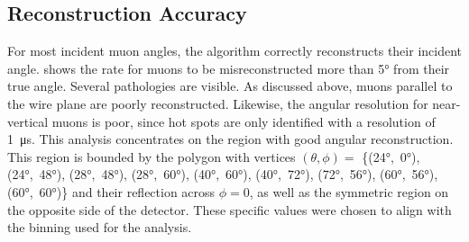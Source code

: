 \documentclass[herrin-thesis.tex]{subfiles}
\begin{document}
\subsection{Reconstruction Accuracy}
For most incident muon angles, the algorithm correctly reconstructs their incident angle.  shows the rate for muons to be misreconstructed more than \ang{5} from their true angle. Several pathologies are visible. As discussed above, muons parallel to the wire plane are poorly reconstructed. Likewise, the angular resolution for near-vertical muons is poor, since hot spots are only identified with a resolution of \SI{1}{\micro\s}. This analysis concentrates on the region with good angular reconstruction. This region is bounded by the polygon with vertices \((\theta,\phi) =\) \{(\ang{24},~\ang{0}), (\ang{24},~\ang{48}), (\ang{28},~\ang{48}), (\ang{28},~\ang{60}), (\ang{40},~\ang{60}), (\ang{40},~\ang{72}), (\ang{72},~\ang{56}), (\ang{60},~\ang{56}), (\ang{60},~\ang{60})\} and their reflection across \(\phi=0\), as well as the symmetric region on the opposite side of the detector. These specific values were chosen to align with the binning used for the analysis.
\end{document}

